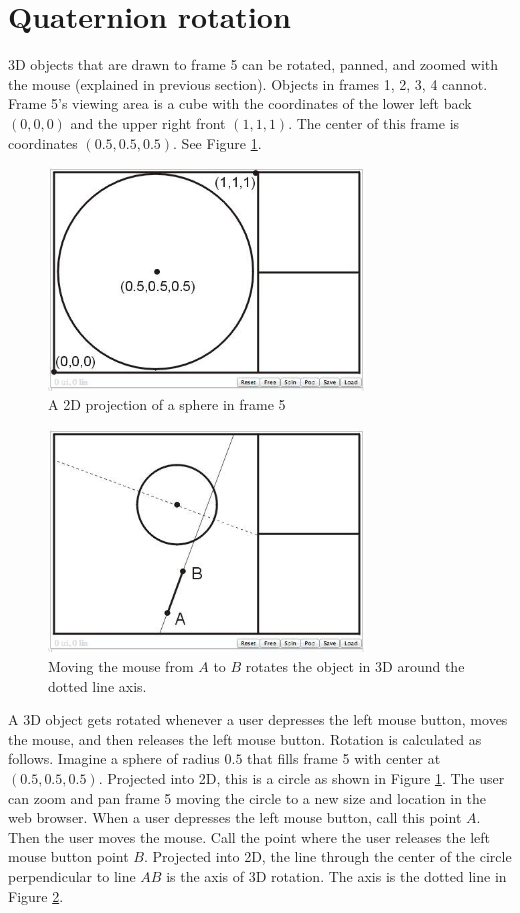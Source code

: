 \section{Quaternion rotation}
3D objects that are drawn to frame 5 can be rotated, panned, and zoomed with the mouse (explained in previous section). 
Objects in frames 1, 2, 3, 4 cannot.
Frame 5's viewing area is a cube with the coordinates of the lower left back $(0,0,0)$ and the upper right front $(1,1,1)$.
The center of this frame is coordinates $(0.5,0.5,0.5)$. See Figure \ref{fig:4-3}.

\begin{figure}[H]
\centering
\includegraphics[width=0.75\textwidth]{pix/circle.jpg}
\caption{A 2D projection of a sphere in frame 5}
\label{fig:4-3}
\end{figure}

\begin{figure}[H]
\centering
\includegraphics[width=0.75\textwidth]{pix/axis3.jpg}
\caption{Moving the mouse from $A$ to $B$ rotates the object in 3D around the dotted line axis.}
\label{fig:4-4}
\end{figure}

A 3D object gets rotated whenever a user depresses the left mouse button, moves the mouse, and then releases the
left mouse button. Rotation is calculated as follows. Imagine a sphere of radius $0.5$ that fills frame 5 with
center at $(0.5,0.5,0.5)$. Projected into 2D, this is a circle as shown in Figure \ref{fig:4-3}. The user can zoom and 
pan frame 5 moving the circle to a new size and location in the web browser. When a user depresses the left mouse button, 
call this point $A$. Then the user moves the mouse. Call the point where the user releases the left mouse button point $B$.
Projected into 2D, the line through the center of the circle perpendicular to line $AB$ is the axis
of 3D rotation. The axis is the dotted line in Figure \ref{fig:4-4}.

